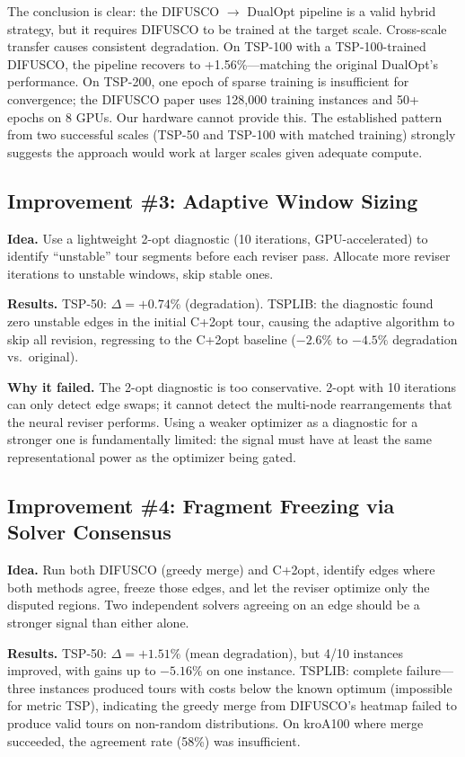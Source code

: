 \documentclass[11pt,a4paper]{article}
\begin{document}
The conclusion is clear: the DIFUSCO $\rightarrow$ DualOpt pipeline is a valid hybrid strategy, but it requires DIFUSCO to be trained at the target scale. Cross-scale transfer causes consistent degradation. On TSP-100 with a TSP-100-trained DIFUSCO, the pipeline recovers to +1.56\%---matching the original DualOpt's performance. On TSP-200, one epoch of sparse training is insufficient for convergence; the DIFUSCO paper uses 128,000 training instances and 50+ epochs on 8 GPUs. Our hardware cannot provide this. The established pattern from two successful scales (TSP-50 and TSP-100 with matched training) strongly suggests the approach would work at larger scales given adequate compute.

\subsection{Improvement \#3: Adaptive Window Sizing}

\textbf{Idea.} Use a lightweight 2-opt diagnostic (10 iterations, GPU-accelerated) to identify ``unstable'' tour segments before each reviser pass. Allocate more reviser iterations to unstable windows, skip stable ones.

\textbf{Results.} TSP-50: $\Delta = +0.74\%$ (degradation). TSPLIB: the diagnostic found zero unstable edges in the initial C+2opt tour, causing the adaptive algorithm to skip all revision, regressing to the C+2opt baseline ($-2.6\%$ to $-4.5\%$ degradation vs.\ original).

\textbf{Why it failed.} The 2-opt diagnostic is too conservative. 2-opt with 10 iterations can only detect edge swaps; it cannot detect the multi-node rearrangements that the neural reviser performs. Using a weaker optimizer as a diagnostic for a stronger one is fundamentally limited: the signal must have at least the same representational power as the optimizer being gated.

\subsection{Improvement \#4: Fragment Freezing via Solver Consensus}

\textbf{Idea.} Run both DIFUSCO (greedy merge) and C+2opt, identify edges where both methods agree, freeze those edges, and let the reviser optimize only the disputed regions. Two independent solvers agreeing on an edge should be a stronger signal than either alone.

\textbf{Results.} TSP-50: $\Delta = +1.51\%$ (mean degradation), but 4/10 instances improved, with gains up to $-5.16\%$ on one instance. TSPLIB: complete failure---three instances produced tours with costs below the known optimum (impossible for metric TSP), indicating the greedy merge from DIFUSCO's heatmap failed to produce valid tours on non-random distributions. On kroA100 where merge succeeded, the agreement rate (58\%) was insufficient.
\end{document}

